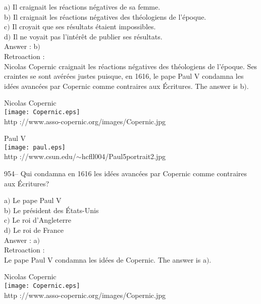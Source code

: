 ﻿\documentclass[letterpaper, 12pt]{article}
\begin{document}
a$)$ Il craignait les r\'eactions n\'egatives de sa femme. \\
b$)$ Il craignait les r\'eactions n\'egatives des th\'eologiens de
l'\'epoque. \\
c$)$ Il croyait que ses r\'esultats \'etaient impossibles.  \\
d$)$ Il ne voyait pas l'int\'er\^et de publier ses r\'esultats. \\

Answer : b$)$\\

Retroaction : \\
Nicolas Copernic craignait les r\'eactions n\'egatives des
th\'eologiens de l'\'epoque. Ses craintes se sont av\'er\'ees justes
puisque, en 1616, le pape Paul V condamna les id\'ees avanc\'ees par
Copernic comme \og contraires aux \'Ecritures\fg . The answer is b$)$.\\

        \begin{center}
        Nicolas Copernic\\
    \texttt{[image: Copernic.eps]}\\
        {\footnotesize http ://www.asso-copernic.org/images/Copernic.jpg}
    \end{center}

        \begin{center}
        Paul V\\
    \texttt{[image: paul.eps]}\\
        {\footnotesize http
://www.csun.edu/$\sim$hcfll004/Paul5portrait2.jpg}
    \end{center}

954-- Qui condamna en 1616 les id\'ees avanc\'ees par Copernic comme
\og contraires aux \'Ecritures\fg ?

a$)$ Le pape Paul V \\
b$)$ Le pr\'esident des \'Etats-Unis \\
c$)$ Le roi d'Angleterre  \\
d$)$ Le roi de France\\

Answer : a$)$\\

Retroaction : \\
Le pape Paul V condamna les id\'ees de Copernic. The answer is a$)$.\\

        \begin{center}
        Nicolas Copernic\\
    \texttt{[image: Copernic.eps]}\\
        {\footnotesize http ://www.asso-copernic.org/images/Copernic.jpg}
    \end{center}
\end{document}
